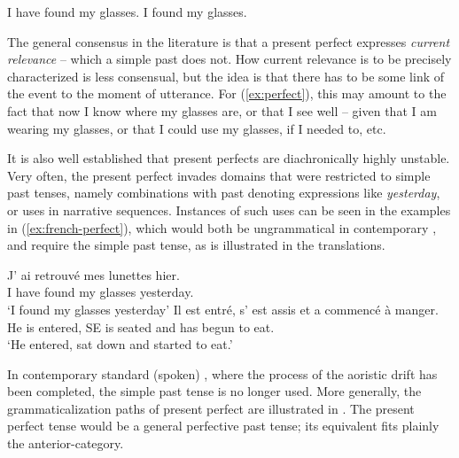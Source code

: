 \documentclass[output=paper,hidelinks]{langscibook}
\begin{document}
\begin{exe}
  \ex
  \begin{xlist}
    \ex \label{ex:perfect}I have found my glasses.
    \ex \label{ex:simple}I found my glasses.
  \end{xlist}
\end{exe}

The general consensus in the literature is that a present perfect expresses \emph{current relevance} -- which a simple past does not. How current relevance is to be precisely characterized is less consensual, but the idea is that there has to be some link of the event to the moment of utterance. For (\ref{ex:perfect}), this may amount to the fact that now I know where my glasses are, or that I see well -- given that I am wearing my glasses, or that I could use my glasses, if I needed to, etc.

It is also well established \citep[see, e.g.,][]{meillet_preterit,bybee94} that present perfects are diachronically highly unstable. Very often, the present perfect invades domains that were restricted to simple past tenses, namely combinations with past denoting expressions like \emph{yesterday}, or uses in narrative sequences. Instances of such uses can be seen in the  examples in (\ref{ex:french-perfect}), which would both be ungrammatical in contemporary , and require the simple past tense, as is illustrated in the translations.

\begin{exe}
  \ex \label{ex:french-perfect}
  \begin{xlist}
    \ex
    \gll J' ai retrouvé mes lunettes hier.\\
    I have found my glasses yesterday.\\
            \glt `I found my glasses yesterday'
    \ex
    \gll Il est entré, s' est assis et a commencé à manger.\\
    He is entered, SE is seated and has begun to eat.\\
    \glt `He entered, sat down and started to eat.'
  \end{xlist}
\end{exe}

In contemporary standard (spoken) , where the process of the aoristic drift has been completed, the simple past tense is no longer used. More generally, the grammaticalization paths of present perfect are illustrated in . The  present perfect tense would be a general perfective past tense; its  equivalent fits plainly the anterior-category. \largerpage
\end{document}
